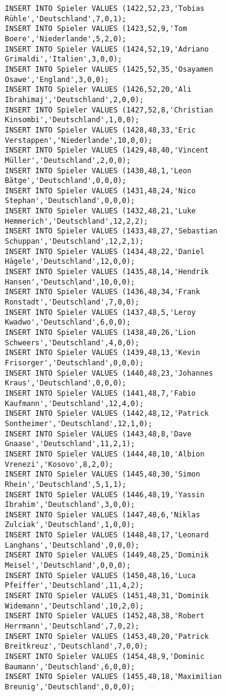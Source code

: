 \documentclass{lehramt-informatik-aufgabe}
\begin{document}
\begin{verbatim}
INSERT INTO Spieler VALUES (1422,52,23,'Tobias Rühle','Deutschland',7,0,1);
INSERT INTO Spieler VALUES (1423,52,9,'Tom Boere','Niederlande',5,2,0);
INSERT INTO Spieler VALUES (1424,52,19,'Adriano Grimaldi','Italien',3,0,0);
INSERT INTO Spieler VALUES (1425,52,35,'Osayamen Osawe','England',3,0,0);
INSERT INTO Spieler VALUES (1426,52,20,'Ali Ibrahimaj','Deutschland',2,0,0);
INSERT INTO Spieler VALUES (1427,52,8,'Christian Kinsombi','Deutschland',1,0,0);
INSERT INTO Spieler VALUES (1428,48,33,'Eric Verstappen','Niederlande',10,0,0);
INSERT INTO Spieler VALUES (1429,48,40,'Vincent Müller','Deutschland',2,0,0);
INSERT INTO Spieler VALUES (1430,48,1,'Leon Bätge','Deutschland',0,0,0);
INSERT INTO Spieler VALUES (1431,48,24,'Nico Stephan','Deutschland',0,0,0);
INSERT INTO Spieler VALUES (1432,48,21,'Luke Hemmerich','Deutschland',12,2,2);
INSERT INTO Spieler VALUES (1433,48,27,'Sebastian Schuppan','Deutschland',12,2,1);
INSERT INTO Spieler VALUES (1434,48,22,'Daniel Hägele','Deutschland',12,0,0);
INSERT INTO Spieler VALUES (1435,48,14,'Hendrik Hansen','Deutschland',10,0,0);
INSERT INTO Spieler VALUES (1436,48,34,'Frank Ronstadt','Deutschland',7,0,0);
INSERT INTO Spieler VALUES (1437,48,5,'Leroy Kwadwo','Deutschland',6,0,0);
INSERT INTO Spieler VALUES (1438,48,26,'Lion Schweers','Deutschland',4,0,0);
INSERT INTO Spieler VALUES (1439,48,13,'Kevin Frisorger','Deutschland',0,0,0);
INSERT INTO Spieler VALUES (1440,48,23,'Johannes Kraus','Deutschland',0,0,0);
INSERT INTO Spieler VALUES (1441,48,7,'Fabio Kaufmann','Deutschland',12,4,0);
INSERT INTO Spieler VALUES (1442,48,12,'Patrick Sontheimer','Deutschland',12,1,0);
INSERT INTO Spieler VALUES (1443,48,8,'Dave Gnaase','Deutschland',11,2,1);
INSERT INTO Spieler VALUES (1444,48,10,'Albion Vrenezi','Kosovo',8,2,0);
INSERT INTO Spieler VALUES (1445,48,30,'Simon Rhein','Deutschland',5,1,1);
INSERT INTO Spieler VALUES (1446,48,19,'Yassin Ibrahim','Deutschland',3,0,0);
INSERT INTO Spieler VALUES (1447,48,6,'Niklas Zulciak','Deutschland',1,0,0);
INSERT INTO Spieler VALUES (1448,48,17,'Leonard Langhans','Deutschland',0,0,0);
INSERT INTO Spieler VALUES (1449,48,25,'Dominik Meisel','Deutschland',0,0,0);
INSERT INTO Spieler VALUES (1450,48,16,'Luca Pfeiffer','Deutschland',11,4,2);
INSERT INTO Spieler VALUES (1451,48,31,'Dominik Widemann','Deutschland',10,2,0);
INSERT INTO Spieler VALUES (1452,48,38,'Robert Herrmann','Deutschland',7,0,2);
INSERT INTO Spieler VALUES (1453,48,20,'Patrick Breitkreuz','Deutschland',7,0,0);
INSERT INTO Spieler VALUES (1454,48,9,'Dominic Baumann','Deutschland',6,0,0);
INSERT INTO Spieler VALUES (1455,48,18,'Maximilian Breunig','Deutschland',0,0,0);

\end{verbatim}
\end{document}

